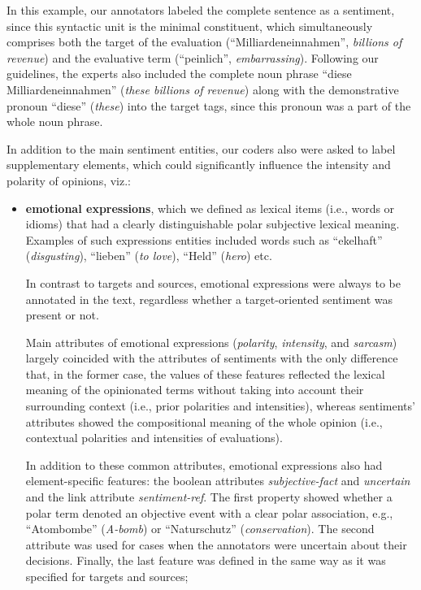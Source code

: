 In this example, our annotators labeled the complete sentence as a
sentiment, since this syntactic unit is the minimal constituent, which
simultaneously comprises both the target of the evaluation
(``Milliardeneinnahmen'', \emph{billions of revenue}) and the
evaluative term (``peinlich'', \emph{embarrassing}).  Following our
guidelines, the experts also included the complete noun phrase ``diese
Milliardeneinnahmen'' (\emph{these billions of revenue}) along with
the demonstrative pronoun ``diese'' (\emph{these}) into the target
tags, since this pronoun was a part of the whole noun phrase.

In addition to the main sentiment entities, our coders also were asked
to label supplementary elements, which could significantly influence
the intensity and polarity of opinions, viz.:

\begin{itemize}
\item
  \textbf{emotional expressions}, which we defined as lexical items
  (i.e., words or idioms) that had a clearly distinguishable polar
  subjective lexical meaning.  Examples of such expressions entities
  included words such as ``ekelhaft'' (\emph{disgusting}), ``lieben''
  (\emph{to love}), ``Held'' (\emph{hero}) etc.

  In contrast to targets and sources, emotional expressions were
  always to be annotated in the text, regardless whether a
  target-oriented sentiment was present or not.

  Main attributes of emotional expressions (\emph{polarity},
  \emph{intensity}, and \emph{sarcasm}) largely coincided with the
  attributes of sentiments with the only difference that, in the
  former case, the values of these features reflected the lexical
  meaning of the opinionated terms without taking into account their
  surrounding context (i.e., prior polarities and intensities),
  whereas sentiments' attributes showed the compositional meaning of
  the whole opinion (i.e., contextual polarities and intensities of
  evaluations).

  In addition to these common attributes, emotional expressions also
  had element-specific features: the boolean attributes
  \emph{subjective-fact} and \emph{uncertain} and the link attribute
  \emph{sentiment-ref}.  The first property showed whether a polar
  term denoted an objective event with a clear polar association,
  e.g., ``Atombombe'' (\emph{A-bomb}) or ``Naturschutz''
  (\emph{conservation}).  The second attribute was used for cases when
  the annotators were uncertain about their decisions.  Finally, the
  last feature was defined in the same way as it was specified for
  targets and sources;


\end{itemize}
